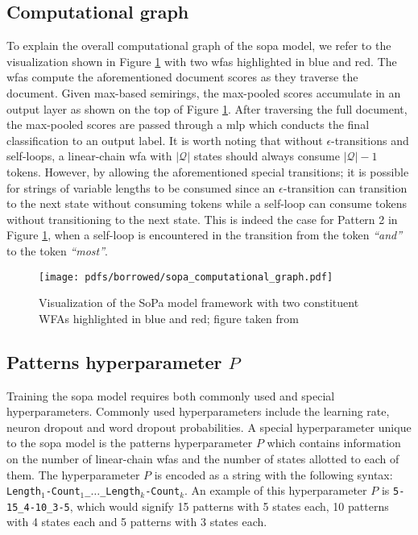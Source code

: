 \subsection{Computational graph}

\label{section:sopa_cg}

To explain the overall computational graph of the \ac{sopa} model, we refer to the
visualization shown in Figure \ref{fig:sopa} with two \ac{wfas} highlighted in
blue and red. The \ac{wfas} compute the aforementioned document scores as they
traverse the document. Given max-based semirings, the max-pooled scores
accumulate in an output layer as shown on the top of Figure \ref{fig:sopa}.
After traversing the full document, the max-pooled scores are passed through a
\ac{mlp} which conducts the final classification to an output label. It is worth
noting that without $\epsilon$-transitions and self-loops, a linear-chain
\ac{wfa} with $|\mathcal{Q}|$ states should always consume $\mathcal{|Q|}-1$
tokens. However, by allowing the aforementioned special transitions; it is
possible for strings of variable lengths to be consumed since an
$\epsilon$-transition can transition to the next state without consuming tokens
while a self-loop can consume tokens without transitioning to the next state.
This is indeed the case for Pattern 2 in Figure \ref{fig:sopa}, when a self-loop
is encountered in the transition from the token \textit{``and''} to the token
\textit{``most''}.

\begin{figure}[t]
  \centering
  \texttt{[image: pdfs/borrowed/sopa\_computational\_graph.pdf]}
  \caption{Visualization of the SoPa model framework with two constituent
    WFAs highlighted in blue and red; figure taken from
    \citet{schwartz2018sopa}}
  \label{fig:sopa}
\end{figure}

\subsection{Patterns hyperparameter $P$}

Training the \ac{sopa} model requires both commonly used and special hyperparameters.
Commonly used hyperparameters include the learning rate, neuron dropout and word
dropout probabilities. A special hyperparameter unique to the \ac{sopa} model is the
patterns hyperparameter $P$ which contains information on the number of
linear-chain \ac{wfas} and the number of states allotted to each of them. The
hyperparameter $P$ is encoded as a string with the following syntax:
\texttt{Length$_{1}$-Count$_{1}$\_$\dots$\_Length$_{k}$-Count$_{k}$}. An example
of this hyperparameter $P$ is \texttt{5-15\_4-10\_3-5}, which would signify 15
patterns with 5 states each, 10 patterns with 4 states each and 5 patterns with
3 states each.

